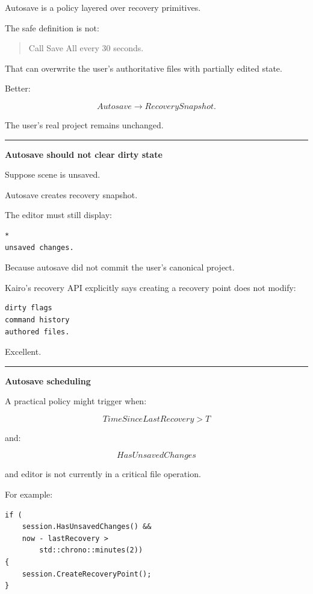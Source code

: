Autosave is a policy layered over recovery primitives.

The safe definition is not:

\begin{quote}
Call Save All every 30 seconds.
\end{quote}

That can overwrite the user's authoritative files with partially edited state.

Better:

\[
\boxed{
Autosave
\rightarrow
RecoverySnapshot.
}
\]

The user's real project remains unchanged.

\begin{center}\rule{0.5\linewidth}{0.5pt}\end{center}

\textbf{Autosave should not clear dirty state}

Suppose scene is unsaved.

Autosave creates recovery snapshot.

The editor must still display:

\begin{verbatim}
*
unsaved changes.
\end{verbatim}

Because autosave did not commit the user's canonical project.

Kairo's recovery API explicitly says creating a recovery point does not modify:

\begin{verbatim}
dirty flags
command history
authored files.
\end{verbatim}

Excellent.

\begin{center}\rule{0.5\linewidth}{0.5pt}\end{center}

\textbf{Autosave scheduling}

A practical policy might trigger when:

\[
TimeSinceLastRecovery
>
T
\]

and:

\[
HasUnsavedChanges
\]

and editor is not currently in a critical file operation.

For example:

\begin{verbatim}
if (
    session.HasUnsavedChanges() &&
    now - lastRecovery >
        std::chrono::minutes(2))
{
    session.CreateRecoveryPoint();
}
\end{verbatim}


